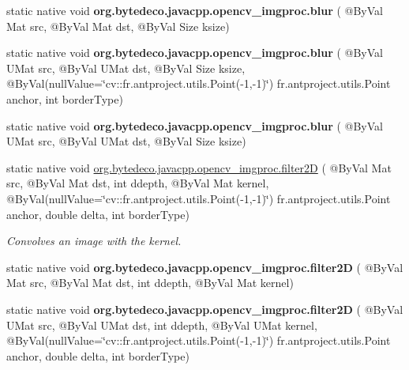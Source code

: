 \begin{DoxyCompactItemize}
\mbox{\label{group__imgproc__filter_ga4830c7c2c9e1f24506bac7bf41da80f0}} 
static native void {\bfseries org.\+bytedeco.\+javacpp.\+opencv\+\_\+imgproc.\+blur} ( @By\+Val Mat src, @By\+Val Mat dst, @By\+Val Size ksize)
\item 
\mbox{\label{group__imgproc__filter_gaf8d9d0c058877480d92f97c45f328347}} 
static native void {\bfseries org.\+bytedeco.\+javacpp.\+opencv\+\_\+imgproc.\+blur} ( @By\+Val U\+Mat src, @By\+Val U\+Mat dst, @By\+Val Size ksize, @By\+Val(null\+Value=\char`\"{}cv\+::\+fr.antproject.utils.Point(-\/1,-\/1)\char`\"{}) fr.antproject.utils.Point anchor, int border\+Type)
\item 
\mbox{\label{group__imgproc__filter_ga8c4367bdc80978100e7b53b8db658752}} 
static native void {\bfseries org.\+bytedeco.\+javacpp.\+opencv\+\_\+imgproc.\+blur} ( @By\+Val U\+Mat src, @By\+Val U\+Mat dst, @By\+Val Size ksize)
\item 
static native void \hyperlink{group__imgproc__filter_gac272007b4c23c22cf0fd246522a2a34b}{org.\+bytedeco.\+javacpp.\+opencv\+\_\+imgproc.\+filter2D} ( @By\+Val Mat src, @By\+Val Mat dst, int ddepth, @By\+Val Mat kernel, @By\+Val(null\+Value=\char`\"{}cv\+::\+fr.antproject.utils.Point(-\/1,-\/1)\char`\"{}) fr.antproject.utils.Point anchor, double delta, int border\+Type)
\begin{DoxyCompactList}\small\item\em Convolves an image with the kernel. \end{DoxyCompactList}\item 
\mbox{\label{group__imgproc__filter_ga32707e41b29e2f45a57863769aed9dda}} 
static native void {\bfseries org.\+bytedeco.\+javacpp.\+opencv\+\_\+imgproc.\+filter2D} ( @By\+Val Mat src, @By\+Val Mat dst, int ddepth, @By\+Val Mat kernel)
\item 
\mbox{\label{group__imgproc__filter_gaae4b6c9ace5e9419ee9a3f1f883bda50}} 
static native void {\bfseries org.\+bytedeco.\+javacpp.\+opencv\+\_\+imgproc.\+filter2D} ( @By\+Val U\+Mat src, @By\+Val U\+Mat dst, int ddepth, @By\+Val U\+Mat kernel, @By\+Val(null\+Value=\char`\"{}cv\+::\+fr.antproject.utils.Point(-\/1,-\/1)\char`\"{}) fr.antproject.utils.Point anchor, double delta, int border\+Type)

\end{DoxyCompactItemize}
